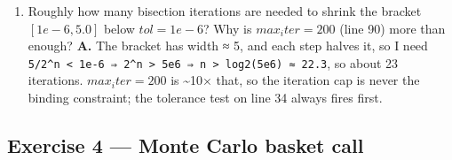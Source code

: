 \documentclass[
  11pt,
]{article}
\begin{document}
\begin{enumerate}
  directly feed your Exercise 1.3 discrepancy discussion? \textbf{A.}
  \(C_mkt\) is the \('Midpoint'\) column (line 94--95 zip over
  \(df_calls['Midpoint']\)). Mid = (bid+ask)/2, so the inverted IV is a
  single point estimate sitting inside the bid--ask spread.
  Discrepancies versus the CSV reference IV (and the bid/ask one would
  get from the quoted spread) come from this choice: the bid--ask spread
  maps to an IV band, and using mid collapses it to one number --- that
  band width, plus discretisation of strikes, is exactly the source of
  the 1.3 mismatch.
\item
  Roughly how many bisection iterations are needed to shrink the bracket
  \([1e-6, 5.0]\) below \(tol = 1e-6\)? Why is \(max_iter = 200\) (line
  90) more than enough? \textbf{A.} The bracket has width ≈ 5, and each
  step halves it, so I need
  \texttt{5/2\^{}n\ \textless{}\ 1e-6\ ⇒\ 2\^{}n\ \textgreater{}\ 5e6\ ⇒\ n\ \textgreater{}\ log2(5e6)\ ≈\ 22.3},
  so about 23 iterations. \(max_iter = 200\) is \textasciitilde10× that,
  so the iteration cap is never the binding constraint; the tolerance
  test on line 34 always fires first.
\end{enumerate}

\hypertarget{exercise-4-monte-carlo-basket-call}{%
\subsection{Exercise 4 --- Monte Carlo basket
call}\label{exercise-4-monte-carlo-basket-call}}
\end{document}
